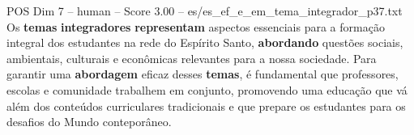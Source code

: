 \begin{textsample}{POS Dim 7 – human – Score 3.00 – es/es\_ef\_e\_em\_tema\_integrador\_p37.txt}  \label{ex:f7_pos_012}
Os \textbf{temas} \textbf{integradores} \textbf{representam} aspectos essenciais para a formação integral dos estudantes na rede do Espírito Santo, \textbf{abordando} questões sociais, ambientais, culturais e econômicas relevantes para a nossa sociedade.
Para garantir uma \textbf{abordagem} eficaz desses \textbf{temas}, é fundamental que professores, escolas e comunidade trabalhem em conjunto, promovendo uma educação que vá além dos conteúdos curriculares tradicionais e que prepare os estudantes para os desafios do Mundo conteporâneo.

\end{textsample}

